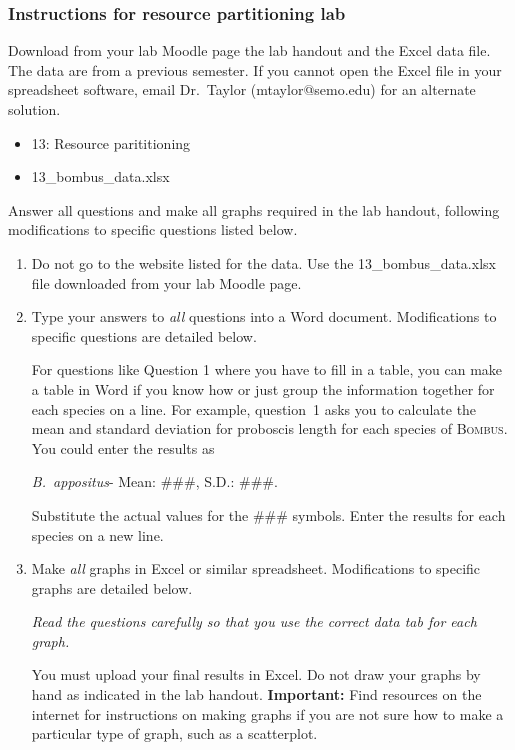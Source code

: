 \documentclass[12pt]{exam}
\begin{document}
\subsubsection*{Instructions for resource partitioning lab}

Download from your lab Moodle page the lab handout and the Excel data file. The data are from a previous semester. If you cannot open the Excel file in your spreadsheet software, email Dr.~Taylor (mtaylor@semo.edu) for an alternate solution.

\begin{itemize}
\item 13: Resource parititioning
\item 13\_bombus\_data.xlsx
\end{itemize}

Answer all questions and make all graphs required in the lab handout, following modifications to specific questions listed below.

\begin{enumerate}

\item Do not go to the website listed for the data. Use the 13\_bombus\_data.xlsx file downloaded from your lab Moodle page.

\item Type your answers to \emph{all} questions into a Word document. Modifications to specific questions are detailed below.

 For questions like Question 1 where you have to fill in a table, you can make a table in Word if you know how or just group the information together for each species on a line. For example, question~1 asks you to calculate the mean and standard deviation for proboscis length for each species of \textsc{Bombus.} You could enter the results as

\textit{B.~appositus}- Mean: \#\#\#, S.D.: \#\#\#.

Substitute the actual values for the \#\#\# symbols. Enter the results for each species on a new line.

\item Make \emph{all} graphs in Excel or similar spreadsheet. Modifications to specific graphs are detailed below. 

\emph{Read the questions carefully so that you use the correct data tab for each graph.}

You must upload your final results in Excel. Do not draw your graphs by hand as indicated in the lab handout. \textbf{Important:} Find resources on the internet for instructions on making graphs if you are not sure how to make a particular type of graph, such as a scatterplot.

\end{enumerate}
\end{document}
